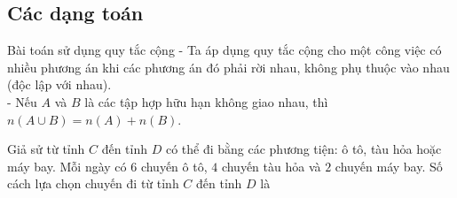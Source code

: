 \subsection{Các dạng toán}
\begin{dang}{Bài toán sử dụng quy tắc cộng}
	- Ta áp dụng quy tắc cộng cho một công việc có nhiều phương án khi các phương án đó phải rời nhau, không phụ thuộc vào nhau (độc lập với nhau).	\\
	- Nếu $ A $ và $ B $ là các tập hợp hữu hạn không giao nhau, thì $ n(A\cup B) =n(A)+n(B) $.
\end{dang}
\viduminhhoa
\begin{vd}%
	Giả sử từ tỉnh $C$ đến tỉnh $D$ có thể đi bằng các phương tiện: ô tô, tàu hỏa hoặc máy bay. Mỗi ngày có $6$ chuyến ô tô, $4$ chuyến tàu hỏa và $2$ chuyến máy bay. Số cách lựa chọn chuyến đi từ tỉnh $C$ đến tỉnh $D$ là
\end{vd}

